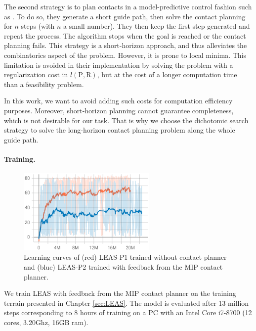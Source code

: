 The second strategy is to plan contacts in a model-predictive control fashion such as \cite{fanny_mip_solo}. 
To do so, they generate a short guide path, then solve the contact planning for $n$ steps (with $n$ a small number).
They then keep the first step generated and repeat the process.
The algorithm stops when the goal is reached or the contact planning fails.
This strategy is a short-horizon approach, and thus alleviates the combinatorics aspect of the problem. 
However, it is prone to local minima.
This limitation is avoided in their implementation by solving the problem with a regularization cost in $l(\mbox{P},\mbox{R})$, but at the cost of a longer computation time than a feasibility problem.

In this work, we want to avoid adding such costs for computation efficiency purposes. 
Moreover, short-horizon planning cannot guarantee completeness, which is not desirable for our task.
That is why we choose the dichotomic search strategy to solve the long-horizon contact planning problem along the whole guide path.



\paragraph{Training.}
\begin{figure}[t]
    \centering
    \includegraphics[trim={0 0 0 0},clip,width=0.6\textwidth]{Figures/Chapter_MIP_SL1M/learning_curve_MIP_P1.png}
    \caption{Learning curves of (red) LEAS-P1 trained without contact planner and (blue) LEAS-P2 trained with feedback from the MIP contact planner.}
    \label{fig:mip:learning_curves}
\end{figure}
We train LEAS with feedback from the MIP contact planner on the training terrain presented in Chapter \ref{sec:LEAS}.
The model is evaluated after 13 million steps corresponding to 8 hours of training on a PC with an Intel Core i7-8700 (12 cores, 3.20Ghz, 16GB ram).

